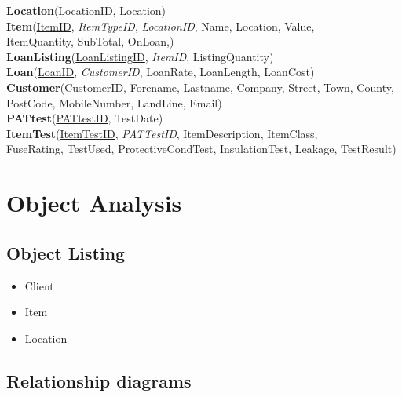 \noindent \textbf{Location}(\underline{LocationID}, Location)\\

\noindent \textbf{Item}(\underline{ItemID}, \emph{ItemTypeID}, \emph{LocationID}, Name, Location, Value,\\
ItemQuantity, SubTotal, OnLoan,)\\

\noindent \textbf{LoanListing}(\underline{LoanListingID}, \emph{ItemID}, ListingQuantity)\\

\noindent \textbf{Loan}(\underline{LoanID}, \emph{CustomerID}, LoanRate, LoanLength, LoanCost)\\

\noindent \textbf{Customer}(\underline{CustomerID}, Forename, Lastname, Company, Street, Town, County,\\
PostCode, MobileNumber, LandLine, Email)\\

\noindent \textbf{PATtest}(\underline{PATtestID}, TestDate)\\ 

\noindent \textbf{ItemTest}(\underline{ItemTestID}, \emph{PATTestID}, ItemDescription, ItemClass,\\
FuseRating, TestUsed, ProtectiveCondTest, InsulationTest, Leakage, TestResult)\\

\section{Object Analysis}

\subsection{Object Listing}

\begin{itemize}
    \item Client
    \item Item
    \item Location
\end{itemize}

\subsection{Relationship diagrams}

